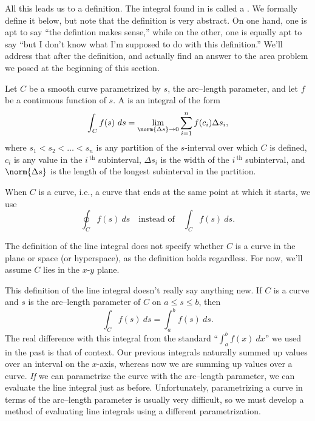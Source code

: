 All this leads us to a definition. The integral found in  is called a . We formally define it below, but note that the definition is very abstract. On one hand, one is apt to say ``the defintion makes sense,'' while on the other, one is equally apt to say ``but I don't know what I'm supposed to do with this definition.'' We'll address that after the definition, and actually find an answer to the area problem we posed at the beginning of this section.


{Let $C$ be a smooth curve parametrized by $s$, the arc--length parameter, and let $f$ be a continuous function of $s$. A  is an integral of the form
\[\int_C f(s)\ ds = \lim_{\norm{\Delta s}\to 0}\sum_{i=1}^n f(c_i)\Delta s_i,\]
where $s_1<s_2<\dots<s_n$ is any partition of the $s$-interval over which $C$ is defined, $c_i$ is any value in the $i\,^\text{th}$ subinterval,  $\Delta s_i$ is the width of the $i\,^\text{th}$ subinterval, and $\norm{\Delta s}$ is the length of the longest subinterval in the partition.}

When $C$ is a  curve, i.e., a curve that ends at the same point at which it starts,  we use
\[\oint_C f(s)\ ds \quad \text{instead of}\quad \int_Cf(s)\ ds.\]

The definition of the line integral does not specify whether $C$ is a curve in the plane or space (or hyperspace), as the definition holds regardless. For now, we'll assume $C$ lies in the $x$-$y$ plane.

This definition of the line integral  doesn't really say anything new. If $C$ is a curve and $s$ is the arc--length parameter of $C$ on $a\leq s\leq b$, then 
\[\int_Cf(s)\ ds = \int_a^bf(s)\ ds.\]
The real difference with this integral from the standard ``$\int_a^bf(x)\ dx$'' we used in the past is that of context. Our previous integrals naturally summed up values over an interval on the $x$-axis, whereas now we are summing up values over a curve. \emph{If} we can parametrize the curve with the arc--length parameter, we can evaluate the line integral just as before. Unfortunately, parametrizing a curve in terms of the arc--length parameter is usually very difficult, so we must develop a method of evaluating line integrals using a different parametrization.

